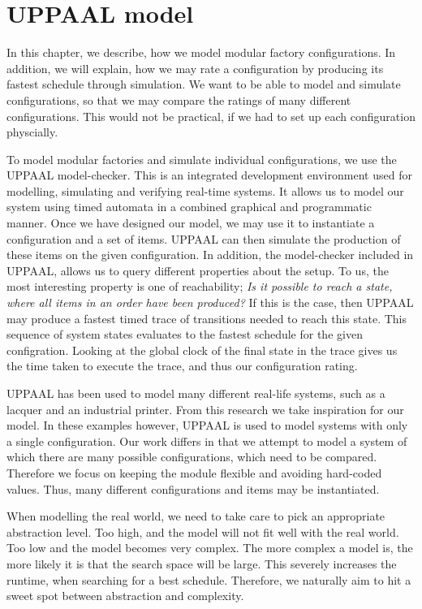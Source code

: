 \chapter{UPPAAL model}\label{ch:uppaalmodel}
In this chapter, we describe, how we model modular factory configurations. In addition, we will explain, how we may rate a configuration by producing its fastest schedule through simulation. We want to be able to model and simulate configurations, so that we may compare the ratings of many different configurations. This would not be practical, if we had to set up each configuration physcially.

To model modular factories and simulate individual configurations, we use the UPPAAL model-checker\cite{Larsen97uppaalin}. This is an integrated development environment used for modelling, simulating and verifying real-time systems. It allows us to model our system using timed automata in a combined graphical and programmatic manner. Once we have designed our model, we may use it to instantiate a configuration and a set of items. UPPAAL can then simulate the production of these items on the given configuration. In addition, the model-checker included in UPPAAL, allows us to query different properties about the setup. To us, the most interesting property is one of reachability; \textit{Is it possible to reach a state, where all items in an order have been produced?} If this is the case, then UPPAAL may produce a fastest timed trace of transitions needed to reach this state. This sequence of system states evaluates to the fastest schedule for the given configration. Looking at the global clock of the final state in the trace gives us the time taken to execute the trace, and thus our configuration rating.

UPPAAL has been used to model many different real-life systems, such as a lacquer\cite{so54514} and an industrial printer\cite{Igna2008}. From this research we take inspiration for our model. In these examples however, UPPAAL is used to model systems with only a single configuration. Our work differs in that we attempt to model a system of which there are many possible configurations, which need to be compared. Therefore we focus on keeping the module flexible and avoiding hard-coded values. Thus, many different configurations and items may be instantiated.

When modelling the real world, we need to take care to pick an appropriate abstraction level. Too high, and the model will not fit well with the real world. Too low and the model becomes very complex. The more complex a model is, the more likely it is that the search space will be large. This severely increases the runtime, when searching for a best schedule. Therefore, we naturally aim to hit a sweet spot between abstraction and complexity.

